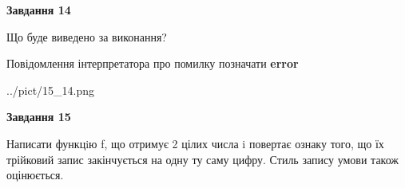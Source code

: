 \documentclass[11pt, ukrainian]{article}
\begin{document}
{\begin {large}
{\begin {center}\textbf{Завдання 14}\end {center}}\par
Що буде виведено за виконання? \par
Повідомлення інтерпретатора про помилку позначати \textbf{error}

\begin{center}
	{../pict/15_14.png}
\end{center}
\newpage

{\begin {center}\textbf{Завдання 15}\end {center}}\par

Написати функцiю f, що отримує 2 цілих числа i повертає ознаку того, що їх трійковий запис закінчується на одну ту саму цифру. Стиль запису умови також оцінюється.\par
\newpage

\end {large}}
\end{document}
